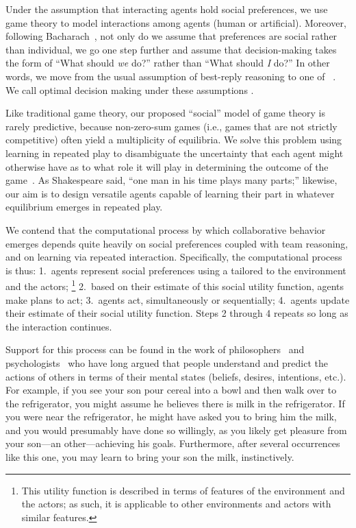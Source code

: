 Under the assumption that interacting agents hold social preferences,
we use game theory to model interactions among agents (human or
artificial).  Moreover, following Bacharach~\cite{2006}, not only do
we assume that preferences are social rather than individual, we go
one step further and assume that decision-making takes the form of
``What should \emph{we\/} do?'' rather than ``What should \emph{I\/}
do?''  In other words, we move from the usual assumption of best-reply
reasoning to one of ~\cite{TEAM REASONING: Bacharach 1999}.
We call optimal decision making under these assumptions .

Like traditional game theory, our proposed ``social'' model of game
theory is rarely predictive, because non-zero-sum games (i.e., games
that are not strictly competitive) often yield a multiplicity of
equilibria.  We solve this problem using learning in repeated play to
disambiguate the uncertainty that each agent might otherwise have as
to what role it will play in determining the outcome of the
game~\cite{add citations of learning as eqm selection}.  As
Shakespeare said, ``one man in his time plays many parts;'' likewise,
our aim is to design versatile agents capable of learning their part
in whatever equilibrium emerges in repeated play.

We contend that the computational process by which collaborative
behavior emerges depends quite heavily on social preferences coupled
with team reasoning, and on learning via repeated interaction.
%
Specifically, the computational process is thus:
1.~agents represent social preferences using a 
tailored to the environment and the actors;%
\footnote{This utility function is described in terms of features of the environment and the actors;
as such, it is applicable to other environments and actors with similar features.}
2.~based on their estimate of this social utility function, agents make plans to act;
3.~agents act, simultaneously or sequentially;
4.~agents update their estimate of their social utility function.
Steps 2 through 4 repeats so long as the interaction continues.

Support for this process can be found in the work of
philosophers~\cite{dennett87} and psychologists~\cite{heider44} who
have long argued that people understand and predict the actions of
others in terms of their mental states (beliefs, desires, intentions,
etc.).  For example, if you see your son pour cereal into a bowl and
then walk over to the refrigerator, you might assume he believes there
is milk in the refrigerator.  If you were near the refrigerator, he
might have asked you to bring him the milk, and you would presumably
have done so willingly, as you likely get pleasure from your son---an
other---achieving his goals.  Furthermore, after several occurrences
like this one, you may learn to bring your son the milk, instinctively.

